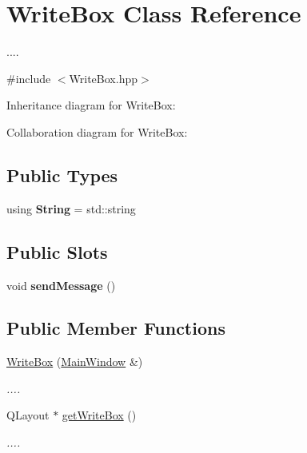 \hypertarget{classWriteBox}{}\section{Write\+Box Class Reference}
\label{classWriteBox}


....  




{\ttfamily \#include $<$Write\+Box.\+hpp$>$}



Inheritance diagram for Write\+Box\+:


Collaboration diagram for Write\+Box\+:
\subsection*{Public Types}
\begin{DoxyCompactItemize}
\item 
using {\bfseries String} = std\+::string\hypertarget{classWriteBox_a64feff0630b723ed37022278a248d206}{}\label{classWriteBox_a64feff0630b723ed37022278a248d206}

\end{DoxyCompactItemize}
\subsection*{Public Slots}
\begin{DoxyCompactItemize}
\item 
void {\bfseries send\+Message} ()\hypertarget{classWriteBox_a94b304997cbaf9b3f4dc1975d60f421f}{}\label{classWriteBox_a94b304997cbaf9b3f4dc1975d60f421f}

\end{DoxyCompactItemize}
\subsection*{Public Member Functions}
\begin{DoxyCompactItemize}
\item 
\hyperlink{classWriteBox_aed152f91f59c5fe8a3de845ee615c601}{Write\+Box} (\hyperlink{classMainWindow}{Main\+Window} \&)
\begin{DoxyCompactList}\small\item\em .... \end{DoxyCompactList}\item 
Q\+Layout $\ast$ \hyperlink{classWriteBox_a0264739b6b85d865237055b1b26061dd}{get\+Write\+Box} ()
\begin{DoxyCompactList}\small\item\em .... \end{DoxyCompactList}\end{DoxyCompactItemize}


